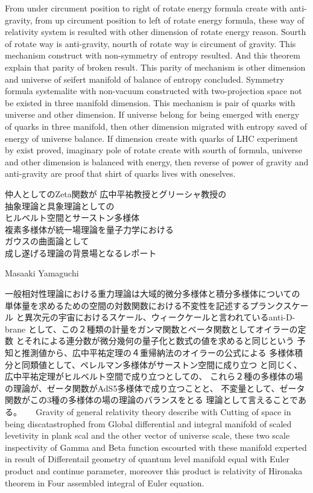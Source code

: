 \documentclass{jsarticle}
\begin{document}
{  From under circument position to right of rotate energy formula create with anti-gravity, from up circument position
to left of rotate energy formula, these way of relativity system is resulted with other dimension of rotate energy
reason. Sourth of rotate way is anti-gravity, nourth of rotate way is circument of gravity.
This mechanism construct with non-symmetry of entropy resulted. And this theorem explain that parity of broken result.
This parity of mechanism is other dimension and universe of seifert manifold of balance of entropy concluded.
 Symmetry formula systemalite with non-vacuum constructed with two-projection space not be existed in three manifold
dimension. This mechanism is pair of quarks with universe and other dimension. If universe belong for being emerged with
energy of quarks in three manifold, then other dimension migrated with entropy saved of energy of universe balance.
If dimension create with quarks of LHC experiment by exist proved, imaginary pole of rotate create with sourth of
formula, universe and other dimension is balanced with energy, then reverse of power of gravity and anti-gravity
are proof that shirt of quarks lives with oneselves.

\newpage
\begin{center}
	仲人としてのZeta関数が 広中平祐教授とグリーシャ教授の\\ 抽象理論と具象理論としての\\ ヒルベルト空間とサーストン多様体\\ 複素多様体が統一場理論を量子力学における\\ ガウスの曲面論として\\ 成し遂げる理論の背景場となるレポート
\end{center}
\begin{center}
	Masaaki Yamaguchi
\end{center}

	 一般相対性理論における重力理論は大域的微分多様体と積分多様体についての 単体量を求めるための空間の対数関数における不変性を記述するプランクスケール と異次元の宇宙におけるスケール、ウィークケールと言われているanti-D-brane として、この２種類の計量をガンマ関数とベータ関数としてオイラーの定数 とそれによる連分数が微分幾何の量子化と数式の値を求めると同じという 予知と推測値から、広中平祐定理の４重帰納法のオイラーの公式による 多様体積分と同類値として、ペレルマン多様体がサーストン空間に成り立つ と同じく、広中平祐定理がヒルベルト空間で成り立つとしての、 これら２種の多様体の場の理論が、ゼータ関数がAdS5多様体で成り立つことと、 不変量として、ゼータ関数がこの3種の多様体の場の理論のバランスをとる
理論として言えることである。
  　 Gravity of general relativity theory describe with Cutting of space
in being discatastrophed from Global differential and integral manifold
of scaled levetivity in plank scal and the other vector of universe
scale, these two scale inspectivity of Gamma and Beta function escourted
with these manifold experted in result of Differentail geometry of
quantum level manifold equal with Euler product and continue parameter,
moreover this product is relativity of Hironaka theorem in Four assembled
integral of Euler equation.

}
\end{document}
